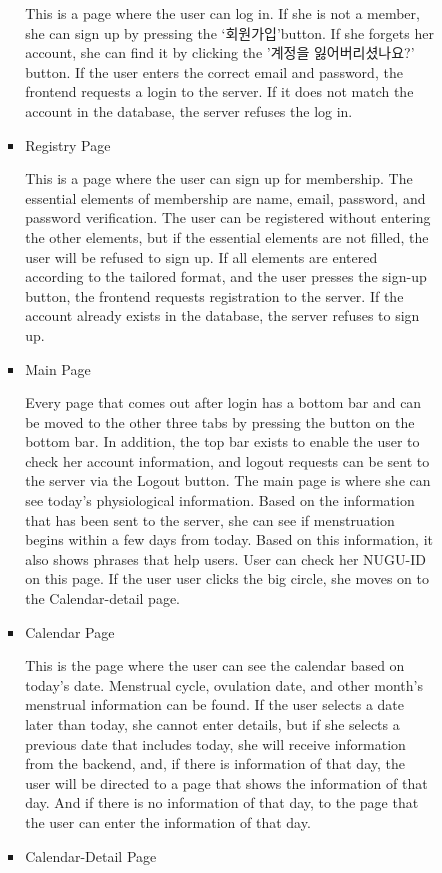 \documentclass[conference]{IEEEtran}
\begin{document}
\begin{itemize}
\begin{enumerate}
\begin{enumerate}
\begin{itemize}
               \setlength{\parindent}{2ex} This is a page where the user can log in. If she is not a member, she can sign up by pressing the ‘회원가입’button. If she forgets her account, she can find it by clicking the '계정을 잃어버리셨나요?' button. If the user enters the correct email and password, the frontend requests a login to the server. If it does not match the account in the database, the server refuses the log in.
                \item Registry Page
            
                \setlength{\parindent}{2ex} This is a page where the user can sign up for membership. The essential elements of membership are name, email, password, and password verification. The user can be registered without entering the other elements, but if the essential elements are not filled, the user will be refused to sign up. If all elements are entered according to the tailored format, and the user presses the sign-up button, the frontend requests registration to the server. If the account already exists in the database, the server refuses to sign up.
                \item Main Page
            
                \setlength{\parindent}{2ex} Every page that comes out after login has a bottom bar and can be moved to the other three tabs by pressing the button on the bottom bar. In addition, the top bar exists to enable the user to check her account information, and logout requests can be sent to the server via the Logout button. The main page is where she can see today's physiological information. Based on the information that has been sent to the server, she can see if menstruation begins within a few days from today. Based on this information, it also shows phrases that help users. User can check her NUGU-ID on this page.
                If the user user clicks the big circle, she moves on to the Calendar-detail page.
                \item Calendar Page
            
                \setlength{\parindent}{2ex} This is the page where the user can see the calendar based on today's date. Menstrual cycle, ovulation date, and other month's menstrual information can be found. If the user selects a date later than today, she cannot enter details, but if she selects a previous date that includes today, she will receive information from the backend, and, if there is information of that day, the user will be directed to a page that shows the information of that day. And if there is no information of that day, to the page that the user can enter the information of that day.
                \item Calendar-Detail Page
            

\end{itemize}
\end{enumerate}
\end{enumerate}
\end{itemize}
\end{document}
